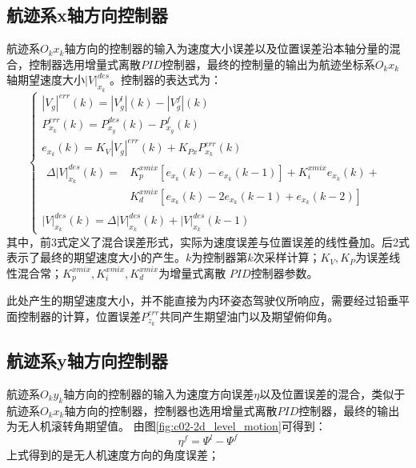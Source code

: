 \subsection{航迹系x轴方向控制器}
航迹系$O_kx_k$轴方向的控制器的输入为速度大小误差以及位置误差沿本轴分量的混合，控制器选用增量式离散$PID$控制器，最终的控制量的输出为航迹坐标系$O_kx_k$轴期望速度大小${|V|}_{x_k}^{des}$。控制器的表达式为：
\begin{equation}
    \left\{
    \begin{array}{l}
        |V_g|^{err}(k)=|V_g^{l}|(k)-|V_g^{f}|(k)\\
        P_{x_k}^{err}(k)=P_{x_g}^{des}(k)-P_{x_g}^{f}(k)\\
        e_{x_k}(k)=K_V|V_g|^{err}(k)+K_{Px}P_{x_k}^{err}(k)\\
        \begin{aligned}
        \Delta{|V|}_{x_k}^{des}(k)=&K_{p}^{xmix}[e_{x_k}(k)-e_{x_k}(k-1)]+K_{i}^{xmix}e_{x_k}(k)+\\
        &K_{d}^{xmix}[e_{x_k}(k)-2e_{x_k}(k-1)+e_{x_k}(k-2)]
        \end{aligned}
        \\
        {|V|}_{x_k}^{des}(k)=\Delta{|V|}_{x_k}^{des}(k)+{|V|}_{x_k}^{des}(k-1)
    \end{array}
    \right .
    \label{xk_vel_gen_equ}
\end{equation}
其中，前3式定义了混合误差形式，实际为速度误差与位置误差的线性叠加。后2式表示了最终的期望速度大小的产生。$k$为控制器第$k$次采样计算；$K_V,K_P$为误差线性混合常；$K_{p}^{xmix},K_{i}^{xmix},K_{d}^{xmix}$为增量式离散
$PID$控制器参数。

此处产生的期望速度大小，并不能直接为内环姿态驾驶仪所响应，需要经过铅垂平面控制器的计算，位置误差$P_{z_k}^{err}$共同产生期望油门以及期望俯仰角。
\subsection{航迹系y轴方向控制器}
航迹系$O_ky_k$轴方向的控制器的输入为速度方向误差$\eta$以及位置误差的混合，类似于航迹系$O_kx_k$轴方向的控制器，控制器也选用增量式离散$PID$控制器，最终的输出为无人机滚转角期望值。
由图\ref{fig:c02-2d_level_motion}可得到：
\begin{equation}
    \eta^f=\Psi^l-\Psi^f
    \label{yaw_error}
\end{equation}
上式得到的是无人机速度方向的角度误差；

